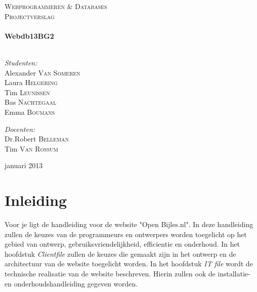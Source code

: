 \documentclass{report}
\begin{document}
    \begin{titlepage}
        \begin{center}

            \textsc{\large Webprogrammeren \& Databases}\\[1.5cm]
            \textsc{\large Projectverslag}\\[0.5cm]
            
            \HRule \\[0.4cm]
            {\huge \bfseries Webdb13BG2}\\[0.4cm]
            \HRule \\[1.5cm]
            
            \begin{minipage}{\textwidth}
                \begin{flushleft}
                    \large \emph{Studenten:}\\
                    Alexander \textsc{Van Someren} \\
                    Laura \textsc{Helgering} \\
                    Tim \textsc{Leunissen} \\
                    Bas \textsc{Nachtegaal} \\
                    Emma \textsc{Boumans}
                \end{flushleft}
            \end{minipage}
            
            \begin{minipage}{\textwidth}
                \begin{flushright}
                    \large \emph{Docenten:} \\
                    Dr.Robert \textsc{Belleman}\\
                    Tim \textsc{Van Rossum}
                \end{flushright}
            \end{minipage}
            
            \vfill
            \large {januari 2013}
        
        \end{center}
    \end{titlepage}

    \tableofcontents

    \section*{Inleiding}
        Voor je ligt de handleiding voor de website "Open Bijles.nl". In deze handleiding zullen de keuzes van de programmeurs en ontwerpers worden toegelicht op het gebied van ontwerp, gebruiksvriendelijkheid, efficientie en onderhoud. In het hoofdstuk \emph{Clientfile} zullen de keuzes die gemaakt zijn in het ontwerp en de architectuur van de website toegelicht worden. In het hoofdstuk \emph{IT file} wordt de technische realisatie van de website beschreven. Hierin zullen ook de installatie- en onderhoudshandleiding gegeven worden.\\
        
\end{document}
